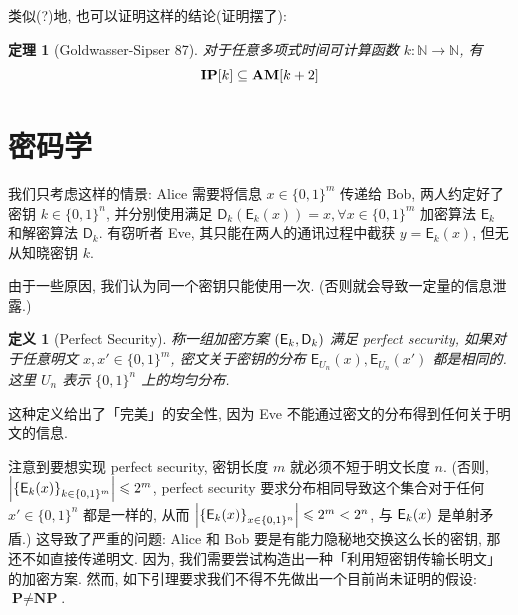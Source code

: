 \documentclass[8pt]{article}
\theoremstyle{compact}
\newtheorem{theorem}{定理}[section]
\newtheorem{definition}{定义}[section]
\def\le{\leqslant}
\def\P{\textbf{P}}
\def\NP{\textbf{NP}}
\begin{document}
类似(?)地, 也可以证明这样的结论(证明摆了): \begin{theorem}[Goldwasser-Sipser 87]
	对于任意多项式时间可计算函数 $k: \mathbb N \to \mathbb N$, 有 $$\textbf{IP}[k] \subseteq \textbf{AM}[k+2]$$
\end{theorem}

\newpage
\section{密码学}
我们只考虑这样的情景: Alice 需要将信息 $x \in \{0, 1\}^m$ 传递给 Bob, 两人约定好了密钥 $k \in \{0, 1\}^n$, 并分别使用满足 $\textsf{D}_k(\textsf{E}_k(x)) = x, \forall x \in \{0, 1\}^m$ 加密算法 $\textsf{E}_k$ 和解密算法 $\textsf{D}_k$. 有窃听者 Eve, 其只能在两人的通讯过程中截获 $y = \textsf{E}_k(x)$, 但无从知晓密钥 $k$.

由于一些原因, 我们认为同一个密钥只能使用一次. (否则就会导致一定量的信息泄露.)

\begin{definition}[Perfect Security]
	称一组加密方案 $(\textsf E_k, \textsf D_k)$ 满足 perfect security, 如果对于任意明文 $x, x' \in \{0, 1\}^m$, 密文关于密钥的分布 $\textsf{E}_{U_n}(x), \textsf{E}_{U_n}(x')$ 都是相同的. 这里 $U_n$ 表示 $\{0, 1\}^n$ 上的均匀分布.
\end{definition}

这种定义给出了「完美」的安全性, 因为 Eve 不能通过密文的分布得到任何关于明文的信息.

注意到要想实现 perfect security, 密钥长度 $m$ 就必须不短于明文长度 $n$. (否则, $\left|\left\{\textsf E_k(x)\right\}_{k \in \{0, 1\}^m}\right| \le 2^m$, perfect security 要求分布相同导致这个集合对于任何 $x' \in \{0, 1\}^n$ 都是一样的, 从而 $\left|\left\{\textsf E_k(x)\right\}_{x \in \{0, 1\}^n}\right| \le 2^m < 2^n$, 与 $\textsf E_k(x)$ 是单射矛盾.) 这导致了严重的问题: Alice 和 Bob 要是有能力隐秘地交换这么长的密钥, 那还不如直接传递明文. 因为, 我们需要尝试构造出一种「利用短密钥传输长明文」的加密方案. 然而, 如下引理要求我们不得不先做出一个目前尚未证明的假设: $\P \neq \NP$.
\end{document}
